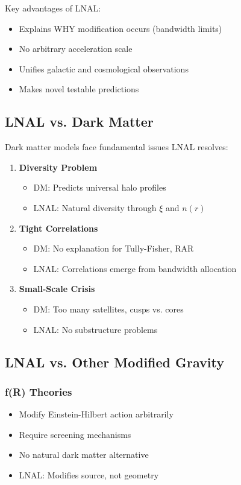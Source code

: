 \documentclass[12pt,letterpaper]{article}
\begin{document}
Key advantages of LNAL:
\begin{itemize}
    \item Explains WHY modification occurs (bandwidth limits)
    \item No arbitrary acceleration scale
    \item Unifies galactic and cosmological observations
    \item Makes novel testable predictions
\end{itemize}

\subsection{LNAL vs. Dark Matter}

Dark matter models face fundamental issues LNAL resolves:

\begin{enumerate}
    \item \textbf{Diversity Problem}
    \begin{itemize}
        \item DM: Predicts universal halo profiles
        \item LNAL: Natural diversity through $\xi$ and $n(r)$
    \end{itemize}
    
    \item \textbf{Tight Correlations}
    \begin{itemize}
        \item DM: No explanation for Tully-Fisher, RAR
        \item LNAL: Correlations emerge from bandwidth allocation
    \end{itemize}
    
    \item \textbf{Small-Scale Crisis}
    \begin{itemize}
        \item DM: Too many satellites, cusps vs. cores
        \item LNAL: No substructure problems
    \end{itemize}
\end{enumerate}

\subsection{LNAL vs. Other Modified Gravity}

\subsubsection{f(R) Theories}
\begin{itemize}
    \item Modify Einstein-Hilbert action arbitrarily
    \item Require screening mechanisms
    \item No natural dark matter alternative
    \item LNAL: Modifies source, not geometry
\end{itemize}
\end{document}
